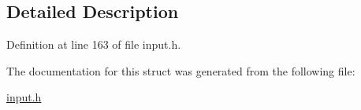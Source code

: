 \subsection{Detailed Description}


Definition at line 163 of file input.\+h.



The documentation for this struct was generated from the following file\+:\begin{DoxyCompactItemize}
\item 
\hyperlink{input_8h}{input.\+h}\end{DoxyCompactItemize}

